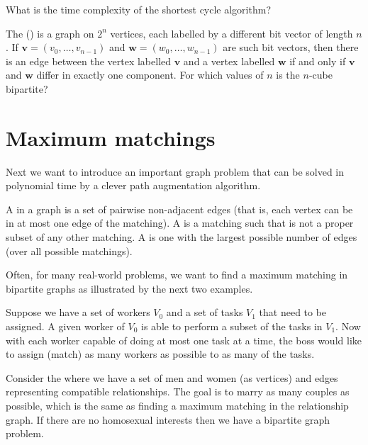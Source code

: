 \begin{Exercise}
\label{ex:shortest-cycle-runtime}
What is the time complexity of the shortest cycle algorithm?
\end{Exercise}

\begin{Exercise}
\label{ex:do2col}
The  () is a 
graph on $2^n$ vertices, each labelled by
a different bit vector of length $n$. If $\mathbf{v} = (v_0, \dots ,
v_{n-1})$ and $\mathbf{w} = (w_0, \dots , w_{n-1})$ are such bit vectors,
then there is an edge between the vertex labelled $\mathbf{v}$ and a
vertex labelled $\mathbf{w}$ if and only if $\mathbf{v}$ and $\mathbf{w}$
differ in exactly one component. For which values of $n$ is the $n$-cube
bipartite?
\end{Exercise}

\section{Maximum matchings}
\label{sec:matching}

Next we want to introduce an important graph problem that can
be solved in polynomial time by a clever path augmentation algorithm.  

\begin{Definition}
A  in a graph is a set of pairwise non-adjacent edges
(that is, each vertex can be in at most one edge of the matching).
A  is a matching such that is not a proper subset
of any other matching.
A  is one with the largest possible number of
edges (over all possible matchings).
\end{Definition}

Often, for many real-world problems, we want to find a maximum matching 
in bipartite graphs as illustrated by the next two examples.  

\begin{Example}
Suppose we have a set of workers $V_0$ and a set of tasks $V_1$ that need to be
assigned.  A given worker of $V_0$ is able to perform a subset of the tasks in $V_1$.
Now with each worker capable of doing at most one task at a time, the boss 
would like to assign (match) as many workers as possible to as many of 
the tasks. 
\end{Example}

\begin{Example}\label{ex:mp}
Consider the  
where we have a set of men and women (as vertices) and edges 
representing compatible 
relationships.  The goal is to marry as many couples
as possible, which is the same as finding a maximum matching in the
relationship graph.  If there are no homosexual interests then we have a 
bipartite graph problem.
\end{Example}

